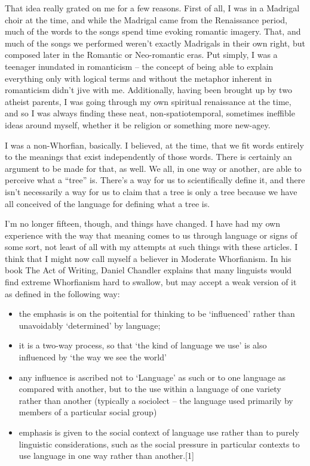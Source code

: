 That idea really grated on me for a few reasons. First of all, I was in a Madrigal choir at the time, and while the Madrigal came from the Renaissance period, much of the words to the songs spend time evoking romantic imagery. That, and much of the songs we performed weren't exactly Madrigals in their own right, but composed later in the Romantic or Neo-romantic eras. Put simply, I was a teenager inundated in romanticism -- the concept of being able to explain everything only with logical terms and without the metaphor inherent in romanticism didn't jive with me. Additionally, having been brought up by two atheist parents, I was going through my own spiritual renaissance at the time, and so I was always finding these neat, non-spatiotemporal, sometimes ineffible ideas around myself, whether it be religion or something more new-agey.

I was a non-Whorfian, basically. I believed, at the time, that we fit words entirely to the meanings that exist independently of those words. There is certainly an argument to be made for that, as well. We all, in one way or another, are able to perceive what a ``tree'' is. There's a way for us to scientifically define it, and there isn't necessarily a way for us to claim that a tree is only a tree because we have all conceived of the language for defining what a tree is.

I'm no longer fifteen, though, and things have changed. I have had my own experience with the way that meaning comes to us through language or signs of some sort, not least of all with my attempts at such things with these articles. I think that I might now call myself a believer in Moderate Whorfianism. In his book The Act of Writing, Daniel Chandler explains that many linguists would find extreme Whorfianism hard to swallow, but may accept a weak version of it as defined in the following way:

\begin{itemize}
  \item the emphasis is on the poitential for thinking to be `influenced' rather than unavoidably `determined' by language;
  \item it is a two-way process, so that `the kind of language we use' is also influenced by `the way we see the world'
  \item any influence is ascribed not to `Language' as such or to one language as compared with another, but to the use within a language of one variety rather than another (typically a sociolect -- the language used primarily by members of a particular social group)
  \item emphasis is given to the social context of language use rather than to purely linguistic considerations, such as the social pressure in particular contexts to use language in one way rather than another.[1]
\end{itemize}

